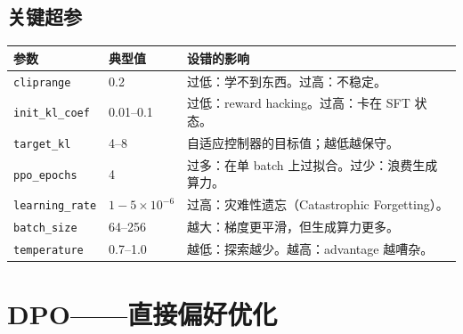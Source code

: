 \section{关键超参}
\label{critical-hyperparameters}
\label{practical-ppo-tips}

\begin{center}
\begin{tabularx}{0.92\linewidth}{@{}l l Z{1}@{}}
\toprule
\textbf{参数} & \textbf{典型值} & \textbf{设错的影响} \\
\midrule
\texttt{cliprange} & 0.2 & 过低：学不到东西。过高：不稳定。 \\
\texttt{init\_kl\_coef} & 0.01--0.1 & 过低：reward hacking。过高：卡在 SFT 状态。 \\
\texttt{target\_kl} & 4--8 & 自适应控制器的目标值；越低越保守。 \\
\texttt{ppo\_epochs} & 4 & 过多：在单 batch 上过拟合。过少：浪费生成算力。 \\
\texttt{learning\_rate} & $1{-}5 \times 10^{-6}$ & 过高：灾难性遗忘（Catastrophic Forgetting）。 \\
\texttt{batch\_size} & 64--256 & 越大：梯度更平滑，但生成算力更多。 \\
\texttt{temperature} & 0.7--1.0 & 越低：探索越少。越高：advantage 越嘈杂。 \\
\bottomrule
\end{tabularx}
\end{center}

\chapter{DPO——直接偏好优化}
\label{dpo-direct-preference-optimization}

